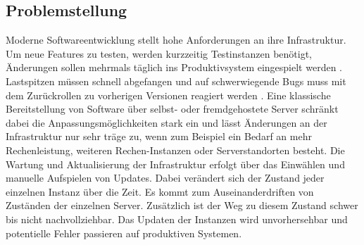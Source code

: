 \documentclass[11pt]{scrartcl}
\begin{document}
\subsection{Problemstellung}
Moderne Softwareentwicklung stellt hohe Anforderungen an ihre Infrastruktur. Um neue Features zu testen, werden kurzzeitig Testinstanzen benötigt, Änderungen sollen mehrmals täglich ins Produktivsystem eingespielt werden \cite{IBM:2019}. Lastspitzen müssen schnell abgefangen und auf schwerwiegende Bugs muss mit dem Zurückrollen zu vorherigen Versionen reagiert werden \cite{Mikkelsen:2019}. Eine klassische Bereitstellung von Software über selbst- oder fremdgehostete Server schränkt dabei die Anpassungsmöglichkeiten stark ein und lässt Änderungen an der Infrastruktur nur sehr träge zu, wenn zum Beispiel ein Bedarf an mehr Rechenleistung, weiteren Rechen-Instanzen oder Serverstandorten besteht. %
\newline 
Die Wartung und Aktualisierung der Infrastruktur erfolgt über das Einwählen und manuelle Aufspielen von Updates. Dabei verändert sich der Zustand jeder einzelnen Instanz über die Zeit. Es kommt zum Auseinanderdriften von Zuständen der einzelnen Server. Zusätzlich ist der Weg zu diesem Zustand schwer bis nicht nachvollziehbar. Das Updaten der Instanzen wird unvorhersehbar und potentielle Fehler passieren auf produktiven Systemen. %

\end{document}
